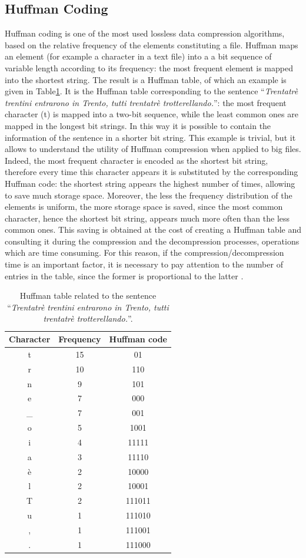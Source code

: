 \subsection{Huffman Coding}
\label{sec:huff}
Huffman coding is one of the most used lossless data compression algorithms, based on the relative frequency of the elements constituting a file. Huffman maps an element (for example a character in a text file) into a a bit sequence of variable length according to its frequency: the most frequent element is mapped into the shortest string. The result is a Huffman table, of which an example is given in Table\ref{tab:huff}. It is the Huffman table corresponding to the sentence ``\textit{Trentatrè trentini entrarono in Trento, tutti trentatrè trotterellando.}'': the most frequent character (t) is mapped into a two-bit sequence, while the least common ones are mapped in the longest bit strings. In this way it is possible to contain the information of the sentence in a shorter bit string. This example is trivial, but it allows to understand the utility of Huffman compression when applied to big files. Indeed, the most frequent character is encoded as the shortest bit string, therefore every time this character appears it is substituted by the corresponding Huffman code: the shortest string appears the highest number of times, allowing to save much storage space. Moreover, the less the frequency distribution of the elements is uniform, the more storage space is saved, since the most common character, hence the shortest bit string, appears much more often than the less common ones. This saving is obtained at the cost of creating a Huffman table and consulting it during the compression and the decompression processes, operations which are time consuming. For this reason, if the compression/decompression time is an important factor, it is necessary to pay attention to the number of entries in the table, since the former is proportional to the latter \cite{huffman}.
%
\begin{table}
\centering
 \begin{tabular}{|c|c|c|}
  \hline
  Character & Frequency & Huffman code\\
  \hline
  t & 15 & 01 \\
  r & 10 & 110 \\
  n & 9 & 101 \\
  e & 7 & 000 \\
  \_ & 7 & 001\\
  o & 5 & 1001 \\
  i & 4 & 11111 \\
  a & 3 & 11110 \\
  è & 2 & 10000 \\
  l & 2 & 10001 \\
  T & 2 & 111011 \\
  u & 1 & 111010 \\
  , & 1 & 111001 \\
  . & 1 & 111000 \\
  \hline
 \end{tabular}
 \caption{Huffman table related to the sentence ``\textit{Trentatrè trentini entrarono in Trento, tutti trentatrè trotterellando.}''.}
 \label{tab:huff}
\end{table}
%
